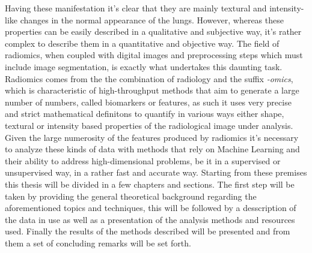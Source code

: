 Having these manifestation it's clear that they are mainly textural and intensity-like changes in the normal appearance of the lungs. However, whereas these properties can be easily described in a qualitative and subjective way, it's rather complex to describe them in a quantitative and objective way. The field of radiomics, when coupled with digital images and preprocessing steps which must include image segmentation, is exactly what undertakes this daunting task. Radiomics comes from the the combination of radiology and the suffix \textit{-omics}, which is characteristic of high-throughput methods that aim to generate a large number of numbers, called biomarkers or features, as such it uses very precise and strict mathematical definitons to quantify in various ways either shape, textural or intensity based properties of the radiological image under analysis.
Given the large numerosity of the features produced by radiomics it's necessary to analyze these kinds of data with methods that rely on Machine Learning and their ability to address high-dimensional problems, be it in a supervised or unsupervised way, in a rather fast and accurate way.
Starting from these premises this thesis will be divided in a few chapters and sections. The first step will be taken by providing the general theoretical background regarding the aforementioned topics and techniques, this will be followed by a desscription of the data in use as well as a presentation of the analysis methods and resources used. Finally the results of the methods described will be presented and from them a set of concluding remarks will be set forth.
